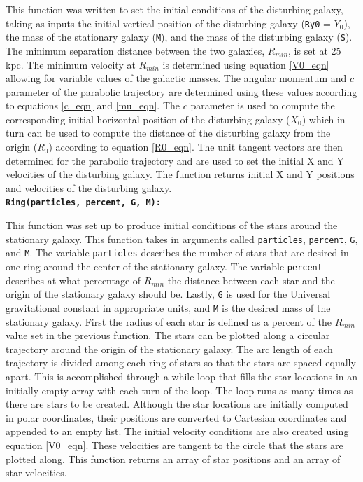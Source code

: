 \documentclass[11pt]{article}
\begin{document}
This function was written to set the initial conditions of the disturbing galaxy, taking as inputs the initial vertical position of the disturbing galaxy (\texttt{Ry0} = $Y_0$), the mass of the stationary galaxy (\texttt{M}), and the mass of the disturbing galaxy (\texttt{S}).  The minimum separation distance between the two galaxies, $R_{min}$, is set at 25 kpc.  The minimum velocity at $R_{min}$ is determined using equation \ref{V0_eqn} allowing for variable values of the galactic masses.  The angular momentum and $c$ parameter of the parabolic trajectory are determined using these values according to equations \ref{c_eqn} and \ref{mu_eqn}.  The $c$ parameter is used to compute the corresponding initial horizontal position of the disturbing galaxy ($X_0$) which in turn can be used to compute the distance of the disturbing galaxy from the origin ($R_0$) according to equation \ref{R0_eqn}.  The unit tangent vectors are then determined for the parabolic trajectory and are used to set the initial X and Y velocities of the disturbing galaxy.  The function returns initial X and Y positions and velocities of the disturbing galaxy.\\

\textbf{\texttt{Ring(particles, percent, G, M):}}

This function was set up to produce initial conditions of the stars around the stationary galaxy.  This function takes in arguments called \texttt{particles}, \texttt{percent}, \texttt{G}, and \texttt{M}.  The variable \texttt{particles} describes the number of stars that are desired in one ring around the center of the stationary galaxy.  The variable \texttt{percent} describes at what percentage of $R_{min}$ the distance between each star and the origin of the stationary galaxy should be. Lastly, \texttt{G} is used for the Universal gravitational constant in appropriate units, and \texttt{M} is the desired mass of the stationary galaxy. First the radius of each star is defined as a percent of the $R_{min}$ value set in the previous function.  The stars can be plotted along a circular trajectory around the origin of the stationary galaxy.  The arc length of each trajectory is divided among each ring of stars so that the stars are spaced equally apart.   This is accomplished through a while loop that fills the star locations in an initially empty array with each turn of the loop.  The loop runs as many times as there are stars to be created.   Although the star locations are initially computed in polar coordinates, their positions are converted to Cartesian coordinates and appended to an empty list.  The initial velocity conditions are also created using equation \ref{V0_eqn}.  These velocities are tangent to the circle that the stars are plotted along.  This function returns an array of star positions and an array of star velocities. \\
\end{document}
